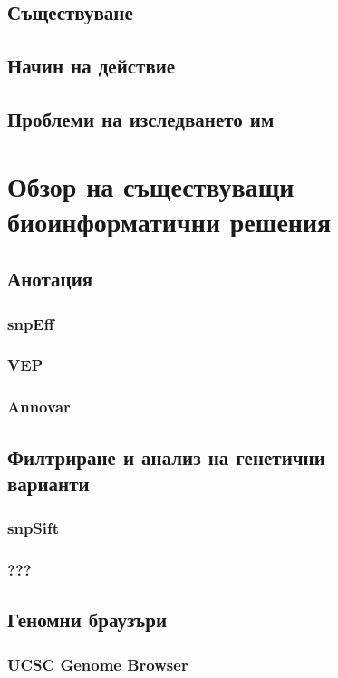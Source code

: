 \documentclass[pdftex,cyrillic,14pt,a4page,twoside]{extreport}
\begin{document}
\section{Съществуване}
\paragraph{}


\section{Начин на действие}
\section{Проблеми на изследването им}
\chapter{Обзор на съществуващи\\ биоинформатични решения}
\section{Анотация}
\subsection{snpEff}
\subsection{VEP}
\subsection{Annovar}
\section{Филтриране и анализ на генетични\\ варианти}
\subsection{snpSift}
\subsection{???}
\section{Геномни браузъри}
\subsection{UCSC Genome Browser}
\end{document}
